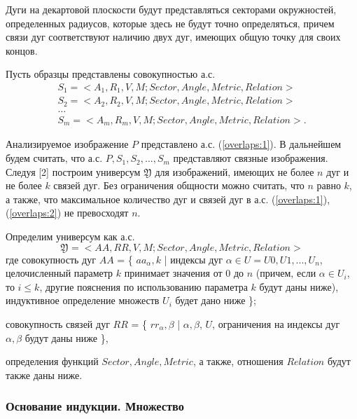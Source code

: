 \begin{remark}
Дуги на декартовой плоскости будут представляться секторами окружностей, определенных радиусов, которые здесь не будут точно определяться, причем связи дуг соответствуют наличию двух дуг, имеющих общую точку для своих концов.  
\end{remark}
Пусть образцы представлены совокупностью   а.с. 
\begin{equation}
\begin{array}{c}
S_1 = < A_1, R_1, V, M; Sector,Angle,Metric,Relation > \\
S_2 = < A_2, R_2, V, M; Sector,Angle,Metric,Relation >  \\                                        
\dots \\
S_m = < A_m, R_m, V, M; Sector,Angle,Metric,Relation >.
\end{array}
\label{overlaps:2}
\end{equation}

Анализируемое изображение $P$ представлено  а.с.  (\ref{overlaps:1}). В дальнейшем будем считать, что а.с. $P, S_1, S_2, . . ., S_m$  представляют связные изображения. 
Следуя [2] построим универсум $\mathfrak{Y}$ для изображений, имеющих не более $n$ дуг и не более $k$ связей дуг. Без ограничения общности можно считать, что $n$ равно $k$, а также, что максимальное количество дуг и связей дуг в  а.с. (\ref{overlaps:1}), (\ref{overlaps:2})  не превосходят  $n$.    

Определим универсум как  а.с.  
\begin{equation}
\mathfrak{Y} = < AA, RR, V, M; Sector,  Angle, Metric, Relation >
\label{overlaps:3}
\end{equation}
\noindent
где  совокупность дуг $AA$ = \{ $aa_\alpha,k$ | индексы дуг $\alpha \in U = U0, U1, ..., U_n$,  целочисленный параметр  $k$  принимает значения от  0  до $n$ (причем,  если  $\alpha \in  U_i$,  то $i \leq k$, другие  пояснения по использованию параметра  $k$  будут даны ниже),  индуктивное определение множеств  $U_i$  будет дано ниже \};


совокупность связей дуг $RR$ = \{ $rr_\alpha, \beta$ | $\alpha, \beta$, $U$, ограничения на индексы дуг $\alpha, \beta$  будут даны ниже \}, 

определения функций  $Sector,  Angle, Metric$, а также, отношения $Relation$  будут также даны ниже.      \\

\subsubsection{Основание индукции.  Множество  }

